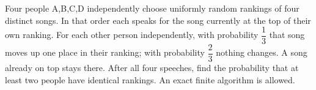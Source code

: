 Four people A,B,C,D independently choose uniformly random rankings of four distinct songs. In that order each speaks for the song currently at the top of their own ranking. For each other person independently, with probability $\dfrac{1}{3}$ that song moves up one place in their ranking; with probability $\dfrac{2}{3}$ nothing changes. A song already on top stays there. After all four speeches, find the probability that at least two people have identical rankings. An exact finite algorithm is allowed.
